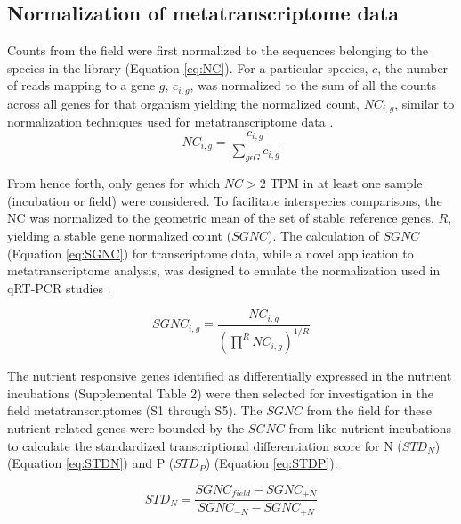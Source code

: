 \subsection{Normalization of metatranscriptome data}
Counts from the field were first normalized to the sequences belonging to the species in the library (Equation \ref{eq:NC}). For a particular species, $c$, the number of reads mapping to a gene $g$, $c_{i,g}$, was normalized to the sum of all the counts across all genes for that organism yielding the normalized count, $NC_{i,g}$, similar to normalization techniques used for metatranscriptome data \citep{Marchetti2012a, Ottesen2011}. 
\begin{equation}
	\label{eq:NC}
	NC_{i,g} = \frac{c_{i,g}}{\sum \limits_{g \epsilon G} c_{i,g}}
\end{equation}

From hence forth, only genes for which $NC > 2$ TPM in at least one sample (incubation or field) were considered. To facilitate interspecies comparisons, the NC was normalized to the geometric mean of the set of stable reference genes, $R$, yielding a stable gene normalized count ($SGNC$). The calculation of $SGNC$ (Equation \ref{eq:SGNC}) for transcriptome data, while a novel application to metatranscriptome analysis, was designed to emulate the normalization used in qRT-PCR studies \citep{Vandesompele2002}. \par
\begin{equation}
	\label{eq:SGNC}
 	SGNC_{i,g}=\frac{NC_{i,g}}{\left ( \prod \limits^{R} NC_{i,g} \right ) ^{1/R}}
\end{equation}

The nutrient responsive genes identified as differentially expressed in the nutrient incubations (Supplemental Table 2) were then selected for investigation in the field metatranscriptomes (S1 through S5). The $SGNC$ from the field for these nutrient-related genes were bounded by the $SGNC$ from like nutrient incubations to calculate the standardized transcriptional differentiation score for N ($STD_N$) (Equation \ref{eq:STDN}) and P ($STD_P$) (Equation \ref{eq:STDP}).\par 

\begin{equation}
	\label{eq:STDN}
	STD_N = \frac{SGNC_{field} - SGNC_{+N}}{SGNC_{-N} - SGNC_{+N}} 	
\end{equation}

